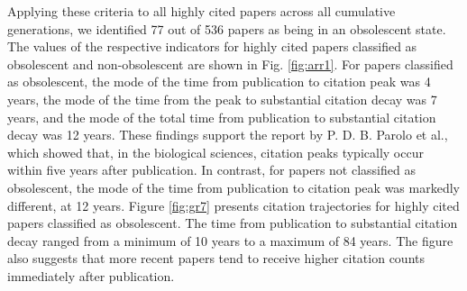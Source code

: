 Applying these criteria to all highly cited papers across all cumulative generations, we identified 77 out of 536 papers as being in an obsolescent state. The values of the respective indicators for highly cited papers classified as obsolescent and non-obsolescent are shown in Fig. \ref{fig:arr1}. For papers classified as obsolescent, the mode of the time from publication to citation peak was 4 years, the mode of the time from the peak to substantial citation decay was 7 years, and the mode of the total time from publication to substantial citation decay was 12 years. These findings support the report by P. D. B. Parolo et al., which showed that, in the biological sciences, citation peaks typically occur within five years after publication. In contrast, for papers not classified as obsolescent, the mode of the time from publication to citation peak was markedly different, at 12 years.
Figure \ref{fig:gr7} presents citation trajectories for highly cited papers classified as obsolescent. The time from publication to substantial citation decay ranged from a minimum of 10 years to a maximum of 84 years. The figure also suggests that more recent papers tend to receive higher citation counts immediately after publication.

